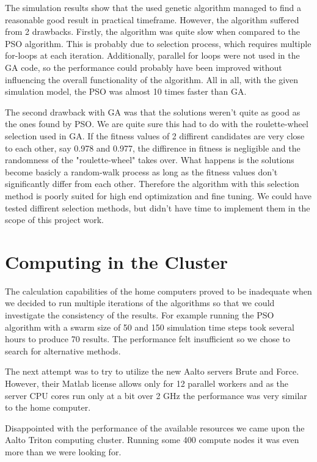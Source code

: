 \documentclass[twoside]{article}
\begin{document}
\begin{multicols}{2}
	The simulation results show that the used genetic algorithm managed to find a reasonable good result in practical timeframe. However, the algorithm suffered from 2 drawbacks. Firstly, the algorithm was quite slow when compared to the PSO algorithm. This is probably due to selection process, which requires multiple for-loops at each iteration. Additionally, parallel for loops were not used in the GA code, so the performance could probably have been improved without influencing the overall functionality of the algorithm. All in all, with the given simulation model, the PSO was almost 10 times faster than GA.
	
	The second drawback with GA was that the solutions weren't quite as good as the ones found by PSO. We are quite sure this had to do with the roulette-wheel selection used in GA. If the fitness values of 2 diffirent candidates are very close to each other, say 0.978 and 0.977, the diffirence in fitness is negligible and the randomness of the "roulette-wheel" takes over. What happens is the solutions become basicly a random-walk process as long as the fitness values don't significantly differ from each other. Therefore the algorithm with this selection method is poorly suited for high end optimization and fine tuning. We could have tested diffirent selection methods, but didn't have time to implement them in the scope of this project work.
	
	
	\section{Computing in the Cluster}
	The calculation capabilities of the home computers proved to be inadequate when we decided to run multiple iterations of the algorithms so that we could investigate the consistency of the results. For example running the PSO algorithm with a swarm size of 50 and 150 simulation time steps took several hours to produce 70 results. The performance felt insufficient so we chose to search for alternative methods.
	
	The next attempt was to try to utilize the new Aalto servers Brute and Force. However, their Matlab license allows only for 12 parallel workers and as the server CPU cores run only at a bit over 2 GHz the performance was very similar to the home computer.
	
	Disappointed with the performance of the available resources we came upon the Aalto Triton computing cluster. Running some 400 compute nodes it was even more than we were looking for.
	

\end{multicols}
\end{document}
